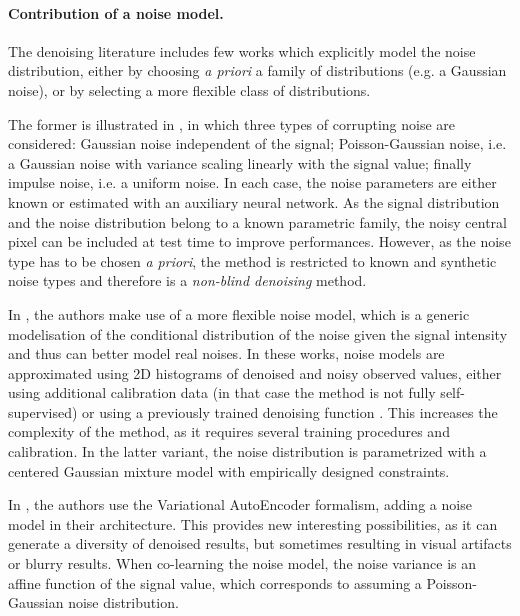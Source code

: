 \documentclass{article}
\begin{document}
\paragraph{Contribution of a noise model.}
The denoising literature includes few works which explicitly model the noise distribution, either by choosing \textit{a priori} a  family of distributions (e.g. a Gaussian noise), or by selecting a more flexible class of distributions.

The former is illustrated in \cite{laine2019high}, in which three types of corrupting noise are considered: Gaussian noise independent of the signal; Poisson-Gaussian noise, i.e. a Gaussian noise with variance scaling linearly with the signal value; finally impulse noise, i.e. a uniform noise. In each case, the noise parameters are either known or estimated with an auxiliary neural network. As the signal distribution and the noise distribution belong to a known parametric family, the noisy central pixel can be included at test time to improve performances. However, as the noise type has to be chosen \textit{a priori}, the method is restricted to known and synthetic noise types and therefore is a \textit{non-blind denoising} method.

In \cite{krull2019probabilistic,prakash2020fully}, the authors make use of a more flexible noise model, which is a generic modelisation of the conditional distribution of the noise given the signal intensity and thus can better model real noises.
In these works, noise models are approximated using 2D histograms of denoised and noisy observed values, either using additional calibration data (in that case the method is not fully self-supervised) or using a previously trained denoising function \cite{prakash2020fully}. This increases the complexity of the method, as it requires several training procedures and calibration.
In the latter variant, the noise distribution is parametrized with a centered Gaussian mixture model with empirically designed constraints.

In \cite{2020DivNoising}, the authors use the Variational Auto\-Encoder formalism, adding a noise model in their architecture.
This provides new interesting possibilities, as it can generate a diversity of denoised results, but sometimes resulting in visual artifacts or blurry results. When co-learning the noise model, the noise variance is an affine function of the signal value, which corresponds to assuming a Poisson-Gaussian noise distribution.
\end{document}

